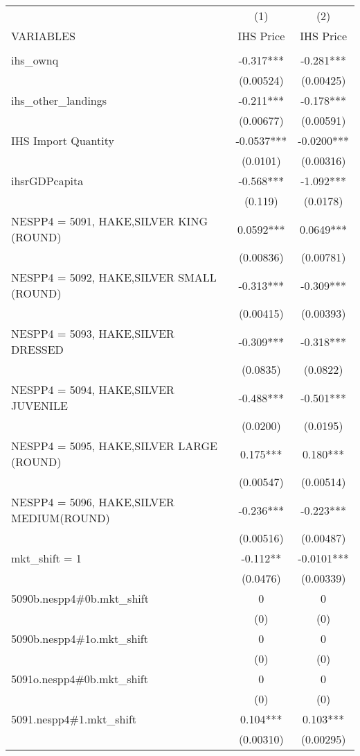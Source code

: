 \begin{tabular}{lcc} \hline
 & (1) & (2) \\
VARIABLES & IHS Price & IHS Price \\ \hline
 &  &  \\
ihs\_ownq & -0.317*** & -0.281*** \\
 & (0.00524) & (0.00425) \\
ihs\_other\_landings & -0.211*** & -0.178*** \\
 & (0.00677) & (0.00591) \\
IHS Import Quantity & -0.0537*** & -0.0200*** \\
 & (0.0101) & (0.00316) \\
ihsrGDPcapita & -0.568*** & -1.092*** \\
 & (0.119) & (0.0178) \\
NESPP4 = 5091, HAKE,SILVER KING (ROUND) & 0.0592*** & 0.0649*** \\
 & (0.00836) & (0.00781) \\
NESPP4 = 5092, HAKE,SILVER SMALL (ROUND) & -0.313*** & -0.309*** \\
 & (0.00415) & (0.00393) \\
NESPP4 = 5093, HAKE,SILVER DRESSED & -0.309*** & -0.318*** \\
 & (0.0835) & (0.0822) \\
NESPP4 = 5094, HAKE,SILVER JUVENILE & -0.488*** & -0.501*** \\
 & (0.0200) & (0.0195) \\
NESPP4 = 5095, HAKE,SILVER LARGE (ROUND) & 0.175*** & 0.180*** \\
 & (0.00547) & (0.00514) \\
NESPP4 = 5096, HAKE,SILVER MEDIUM(ROUND) & -0.236*** & -0.223*** \\
 & (0.00516) & (0.00487) \\
mkt\_shift = 1 & -0.112** & -0.0101*** \\
 & (0.0476) & (0.00339) \\
5090b.nespp4\#0b.mkt\_shift & 0 & 0 \\
 & (0) & (0) \\
5090b.nespp4\#1o.mkt\_shift & 0 & 0 \\
 & (0) & (0) \\
5091o.nespp4\#0b.mkt\_shift & 0 & 0 \\
 & (0) & (0) \\
5091.nespp4\#1.mkt\_shift & 0.104*** & 0.103*** \\
 & (0.00310) & (0.00295) \\

\end{tabular}
